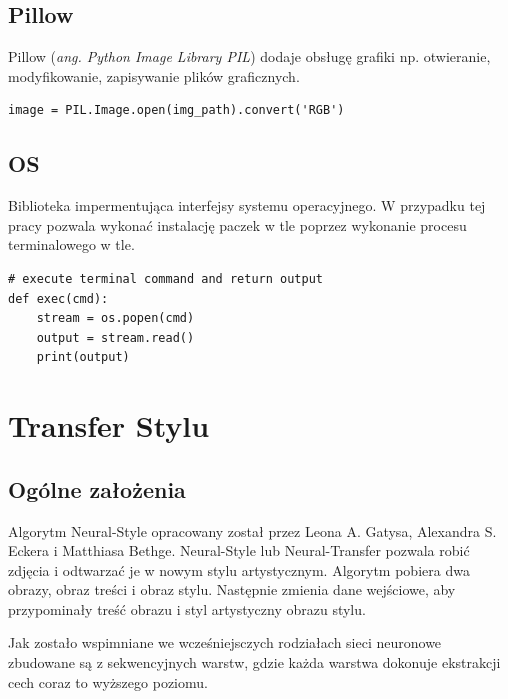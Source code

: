 \documentclass[brudnopis]{xmgr}
\begin{document}
\section{Pillow\label{s:dsssl}}
    
   Pillow (\textit{ang. Python Image Library PIL}) dodaje obsługę grafiki np. otwieranie, modyfikowanie, zapisywanie plików graficznych.
   
\begin{lstlisting}
image = PIL.Image.open(img_path).convert('RGB')
\end{lstlisting}
   
    
\section{OS\label{s:dsssl}}
        
Biblioteka impermentująca interfejsy systemu operacyjnego. W przypadku tej pracy pozwala wykonać instalację paczek w tle poprzez wykonanie procesu terminalowego w tle. 


\begin{lstlisting}
# execute terminal command and return output
def exec(cmd):
    stream = os.popen(cmd)
    output = stream.read()
    print(output)
\end{lstlisting}



\chapter{Transfer Stylu }

\section{Ogólne założenia\label{s:dsssl}}

Algorytm Neural-Style opracowany został przez Leona A. Gatysa, Alexandra S. Eckera i Matthiasa Bethge. Neural-Style lub Neural-Transfer pozwala robić zdjęcia i odtwarzać je w nowym stylu artystycznym. Algorytm pobiera dwa obrazy, obraz treści i obraz stylu. Następnie zmienia dane wejściowe, aby przypominały treść obrazu i styl artystyczny obrazu stylu.

Jak zostało wspimniane we wcześniejsczych rodziałach sieci neuronowe zbudowane są z sekwencyjnych warstw, gdzie każda warstwa dokonuje ekstrakcji cech coraz to wyższego poziomu.
\end{document}

